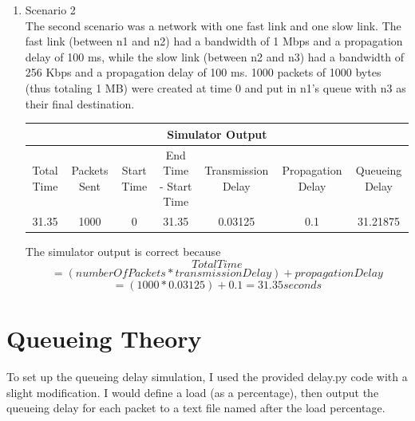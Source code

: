 \documentclass[11pt]{article}
\begin{document}
\begin{enumerate}
\item Scenario 2 \hfill \\
The second scenario was a network with one fast link and one slow link. The fast link (between n1 and n2) had a bandwidth of 1 Mbps and a propagation delay of 100 ms, while the slow link (between n2 and n3) had a bandwidth of 256 Kbps and a propagation delay of 100 ms. 1000 packets of 1000 bytes (thus totaling 1 MB) were created at time 0 and put in n1's queue with n3 as their final destination.
\begin{center}
\begin{tabular}{ c c c c c c c }
  \multicolumn{7}{c}{Simulator Output} \\
  \hline
  {\tiny Total Time} & {\tiny Packets Sent} & {\tiny Start Time} & {\tiny End Time - Start Time} & {\tiny Transmission Delay} & {\tiny Propagation Delay} & {\tiny Queueing Delay}\\
  31.35 & 1000 & 0 & 31.35 & 0.03125 & 0.1 & 31.21875 \\
\end{tabular}
\end{center}
The simulator output is correct because
$$Total Time$$
$$= (numberOfPackets * transmissionDelay) + propagationDelay$$
$$= (1000*0.03125) + 0.1 = 31.35 seconds$$

\end{enumerate}

\section{Queueing Theory}

To set up the queueing delay simulation, I used the provided delay.py code with a slight modification. I would define a load (as a percentage), then output the queueing delay for each packet to a text file named after the load percentage.
\end{document}

